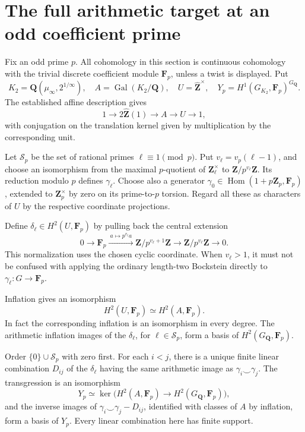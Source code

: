 \section{The full arithmetic target at an odd coefficient prime}
\label{sec:odd-galois-target}

Fix an odd prime \(p\).  All cohomology in this section is
continuous cohomology with the trivial discrete coefficient
module \(\mathbf F_p\), unless a twist is displayed.  Put
\[
 K_2=\mathbf Q(\mu_\infty,2^{1/\infty}),\quad
 A=\operatorname{Gal}(K_2/\mathbf Q),\quad
 U=\widehat{\mathbf Z}^{\times},\quad
 Y_p=H^1(G_{K_2},\mathbf F_p)^{G_{\mathbf Q}}.
\]
The established affine description gives
\begin{equation}\label{eq:odd-target-affine-extension}
 1\longrightarrow 2\widehat{\mathbf Z}(1)
       \longrightarrow A\longrightarrow U\longrightarrow1,
\end{equation}
with conjugation on the translation kernel given by
multiplication by the corresponding unit.

Let \(\mathcal S_p\) be the set of rational primes
\(\ell\equiv1\pmod p\).  Put
\(v_\ell=v_p(\ell-1)\), and choose an isomorphism from
the maximal \(p\)-quotient of \(\mathbf Z_\ell^\times\)
to \(\mathbf Z/p^{v_\ell}\mathbf Z\).
Its reduction modulo \(p\) defines \(\gamma_\ell\).
Choose also a generator
\(\gamma_0\in\operatorname{Hom}(1+p\mathbf Z_p,\mathbf F_p)\),
extended to \(\mathbf Z_p^\times\) by zero on its
prime-to-\(p\) torsion.  Regard all these as characters
of \(U\) by the respective coordinate projections.

Define \(\delta_\ell\in H^2(U,\mathbf F_p)\) by pulling
back the central extension
\begin{equation}\label{eq:odd-target-cyclic-extension}
 0\longrightarrow\mathbf F_p
   \xrightarrow{\ a\mapsto p^{v_\ell}a\ }
   \mathbf Z/p^{v_\ell+1}\mathbf Z
   \longrightarrow\mathbf Z/p^{v_\ell}\mathbf Z
   \longrightarrow0.
\end{equation}
This normalization uses the chosen cyclic coordinate.
When \(v_\ell>1\), it must not be confused with applying
the ordinary length-two Bockstein directly to
\(\gamma_\ell:G\to\mathbf F_p\).

\begin{theorem}\label{thm:odd-full-galois-target}
Inflation gives an isomorphism
\[
                         H^2(U,\mathbf F_p)\simeq H^2(A,\mathbf F_p).
\]
In fact the corresponding inflation is an isomorphism in
every degree.  The arithmetic inflation images of the
\(\delta_\ell\), for \(\ell\in\mathcal S_p\), form a
basis of \(H^2(G_{\mathbf Q},\mathbf F_p)\).

Order \(\{0\}\cup\mathcal S_p\) with zero first.  For
each \(i<j\), there is a unique finite linear combination
\(D_{ij}\) of the \(\delta_\ell\) having the same
arithmetic image as \(\gamma_i\smile\gamma_j\).
The transgression is an isomorphism
\[
 Y_p\simeq
 \ker\bigl(H^2(A,\mathbf F_p)
                  \longrightarrow H^2(G_{\mathbf Q},\mathbf F_p)\bigr),
\]
and the inverse images of
\(\gamma_i\smile\gamma_j-D_{ij}\), identified with
classes of \(A\) by inflation, form a basis of \(Y_p\).
Every linear combination here has finite support.
\end{theorem}


